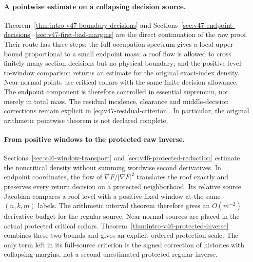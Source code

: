 \documentclass[11pt,reqno]{amsart}
\numberwithin{equation}{section}
\theoremstyle{definition}\newtheorem{definition}[theorem]{Definition}
\theoremstyle{remark}\newtheorem{remark}[theorem]{Remark}
\begin{document}
\paragraph{A pointwise estimate on a collapsing decision source.}
Theorem~\ref{thm:intro-v47-boundary-decisions} and
Sections~\ref{sec:v47-endpoint-decisions}--\ref{sec:v47-first-bad-margins}
are the direct continuation of the raw proof. Their route has three
steps: the full occupation spectrum gives a local upper bound
proportional to a small endpoint mass; a roof flow is allowed to cross
finitely many section decisions but no physical boundary; and the
positive level-to-window comparison returns an estimate for the
original exact-index density. Near-normal points use critical collars
with the same finite decision allowance. The endpoint component is
therefore controlled in essential supremum, not merely in total mass.
The residual incidence, clearance and middle-decision corrections
remain explicit in \eqref{eq:v47-residual-criterion}. In particular,
the original arithmetic pointwise theorem is not declared complete.

\paragraph{From positive windows to the protected raw inverse.}
Sections~\ref{sec:v46-window-transport} and
\ref{sec:v46-protected-reduction} estimate the noncritical density
without summing wordwise second derivatives. In endpoint coordinates,
the flow of $\nabla F/|\nabla F|^2$ translates the roof exactly and
preserves every return decision on a protected neighborhood. Its
relative source Jacobian compares a roof level with a positive fixed
window at the same $(n,k,m)$ labels. The arithmetic interval theorem
therefore gives an $O(m^{-2})$ derivative budget for the regular source.
Near-normal sources are placed in the actual protected critical collars.
Theorem~\ref{thm:intro-v46-protected-inverse} combines these two bounds
and gives an explicit ordered protection scale. The only term left in
its full-source criterion is the signed correction of histories with
collapsing margins, not a second unestimated protected regular inverse.
\end{document}
